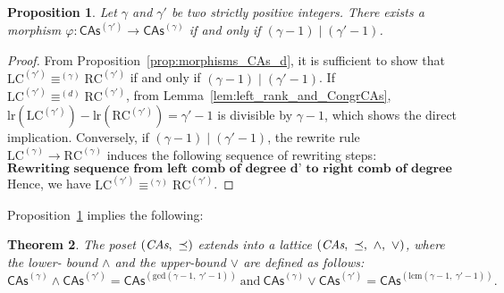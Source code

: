 \documentclass[10pt,reqno]{amsart}
\numberwithin{equation}{subsection}
\newtheorem{Theorem}{Theorem}[subsection]
\newtheorem{Proposition}[Theorem]{Proposition}
\newcommand{\CAs}[1]{\mathsf{CAs}^{(#1)}}
\newcommand{\LC}[1]{\text{LC}^{(#1)}}
\newcommand{\RC}[1]{\text{RC}^{(#1)}}
\DeclareMathOperator{\Congr}{\equiv}
\DeclareMathOperator{\Rew}{\to}
\newcommand{\CongrCAs}[1]{\Congr^{(#1)}}
\begin{document}
\begin{Proposition} \label{prop:division_CAs}
  Let $\gamma$ and $\gamma'$ be two strictly positive integers. There exists a morphism
  $\varphi:\CAs{\gamma'}\to\CAs{\gamma}$ if and only if $\left(\gamma-1\right)\mid\left(\gamma'-1\right)$.
\end{Proposition}
\begin{proof}
  From Proposition~\ref{prop:morphisms_CAs_d}, it is sufficient to show that $\LC{\gamma'}\CongrCAs{\gamma}\RC{\gamma'}$
  if and only if $\left(\gamma-1\right)\mid\left(\gamma'-1\right)$. If $\LC{\gamma'}\CongrCAs{d}\RC{\gamma'}$, from
  Lemma~\ref{lem:left_rank_and_CongrCAs}, $\text{lr}\left(\LC{\gamma'}\right)-\text{lr}\left(\RC{\gamma'}\right)=\gamma'-1$
  is divisible by $\gamma-1$, which shows the direct implication. Conversely, if
  $\left(\gamma-1\right)\mid\left(\gamma'-1\right)$, the rewrite rule $\LC{\gamma}\Rew\RC{\gamma}$ induces the
  following sequence of rewriting steps:
  \[\textbf{Rewriting sequence from left comb of degree d' to right comb of degree d'}\]
  Hence, we have $\LC{\gamma'}\CongrCAs{\gamma}\RC{\gamma'}$.
   \end{proof}

Proposition~\ref{prop:division_CAs} implies the following:
\begin{Theorem}\label{thm:lattice_CAs}
  The poset $\left(\emph{CAs},\ \preceq\right)$ extends into a lattice
  $\left(\emph{CAs},\ \preceq,\ \wedge,\ \vee\right)$, where the lower-
  bound $\wedge$ and the upper-bound $\vee$ are defined as follows:
  \[\CAs{\gamma}\wedge\CAs{\gamma'}=\CAs{\text{gcd}\left(\gamma-1,\ \gamma'-1\right)}\
  \text{and}\ \CAs{\gamma}\vee\CAs{\gamma'}=\CAs{\text{lcm}\left(\gamma-1,\ \gamma'-1\right)}.\]
  \end{Theorem}



\end{document}
